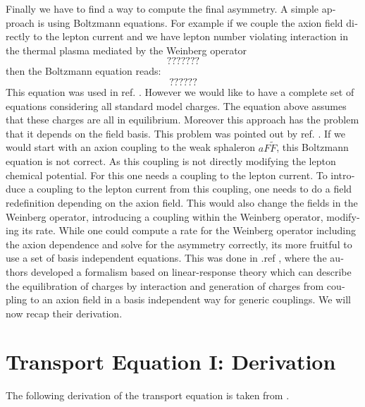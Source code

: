 \documentclass[master,       %
               twoside,        %
               BCOR10mm,       %
               english,ngerman, %
               ]{GAUBM}
\begin{document}
\begin{otherlanguage}{english}
Finally we have to find a way to compute the final asymmetry.
A simple approach is using Boltzmann equations. For example if we couple
the axion field directly to the lepton current and we have lepton number violating interaction in the thermal plasma mediated by the Weinberg operator
\begin{equation}
	???????
\end{equation}
then the Boltzmann equation reads:
\begin{equation}
	??????
\end{equation}
This equation was used in ref. \cite{Kusenko_2015_Axion_Leptogenesis}.
However we would like to have a complete set of equations considering all standard model charges. The equation above assumes that these charges are all in equilibrium.
Moreover this approach has the problem that it depends on the field basis.
This problem was pointed out by ref. \cite{Shi_2015_Basis_Invariance_chemical_equilibrium}.
If we would start with an axion coupling to the weak sphaleron $a F \tilde{F}$, this Boltzmann equation is not correct. As this coupling is not directly modifying the lepton chemical potential. For this one needs a coupling to the lepton current.
To introduce a coupling to the lepton current from this coupling, one needs to do a field redefinition depending on the axion field. This would also change the fields in the Weinberg operator, introducing a coupling within the Weinberg operator, modifying its rate. While one could compute a rate for the Weinberg operator including the axion dependence and solve for the asymmetry correctly, its more fruitful to use a set of basis independent equations.
This was done in .ref \cite{Domcke:2020kcp_Generic_Couplings}, where the authors developed a formalism based on linear-response theory which can describe the equilibration of charges by interaction and generation of charges from coupling to an axion field in a basis independent way for generic couplings. We will now recap their derivation.

\section{Transport Equation I: Derivation}
The following derivation of the transport equation is taken from  \cite[appendix B]{Domcke:2020kcp_Generic_Couplings}.


\end{otherlanguage}
\end{document}
